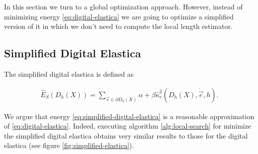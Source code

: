 In this section we turn to a global optimization approach. However, instead of minimizing energy \eqref{eq:digital-elastica} we are going to optimize a simplified version of it in which we don't need to compute the local length estimator.

\subsection{Simplified Digital Elastica}

The simplified digital elastica is defined as

	\begin{align}
	\hat{E}_S( D_h(X) ) = \sum_{\dot{\vec{e}} \in \partial D_h(X)}{ \alpha + \beta \hat{\kappa}_{r}^2(D_h(X),\dot{\vec{e}},h) }.
	\label{eq:simplified-digital-elastica}
	\end{align}
	

We argue that energy \eqref{eq:simplified-digital-elastica} is a reasonable approximation of \eqref{eq:digital-elastica}. Indeed, executing algorithm \ref{alg:local-search} for minimize the simplified digital elastica obtains very similar results to those for the digital elastica (see figure \ref{fig:simplified-elastica}).


